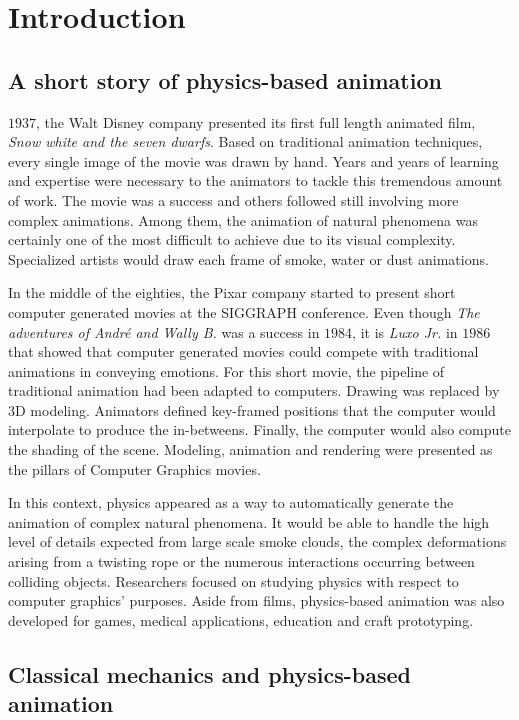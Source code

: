 \chapter{Introduction}
\label{chap:introduction}

\section{A short story of physics-based animation}

 $1937$, the Walt Disney company presented its first full length animated film, \emph{Snow white and the seven dwarfs}. Based on traditional animation techniques, every single image of the movie was drawn by hand. Years and years of learning and expertise were necessary to the animators to tackle this tremendous amount of work. The movie was a success and others followed still involving more complex animations. Among them, the animation of natural phenomena was certainly one of the most difficult to achieve due to its visual complexity. Specialized artists would draw each frame of smoke, water or dust animations.

In the middle of the eighties, the Pixar company started to present short computer generated movies at the SIGGRAPH conference. Even though \emph{The adventures of André and Wally B.} was a success in $1984$, it is \emph{Luxo Jr.} in $1986$ that showed that computer generated movies could compete with traditional animations in conveying emotions. For this short movie, the pipeline of traditional animation had been adapted to computers. Drawing was replaced by 3D modeling. Animators defined key-framed positions that the computer would interpolate to produce the in-betweens. Finally, the computer would also compute the shading of the scene. Modeling, animation and rendering were presented as the pillars of Computer Graphics movies.

In this context, physics appeared as a way to automatically generate the animation of complex natural phenomena. It would be able to handle the high level of details expected from large scale smoke clouds, the complex deformations arising from a twisting rope or the numerous interactions occurring between colliding objects. Researchers focused on studying physics with respect to computer graphics' purposes. Aside from films, physics-based animation was also developed for games, medical applications, education and craft prototyping.

\section{Classical mechanics and physics-based animation}

